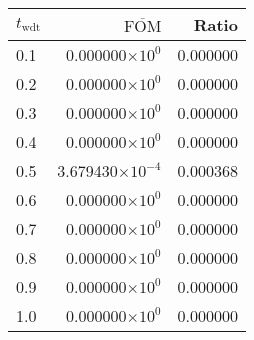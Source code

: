 \begin{tabular}{lrr}
\toprule
$t_{\mathrm{wdt}}$ & $\overline{\mathrm{FOM}}$ &    Ratio \\
\midrule
               0.1 &   0.000000$\times 10^{0}$ & 0.000000 \\
               0.2 &   0.000000$\times 10^{0}$ & 0.000000 \\
               0.3 &   0.000000$\times 10^{0}$ & 0.000000 \\
               0.4 &   0.000000$\times 10^{0}$ & 0.000000 \\
               0.5 &  3.679430$\times 10^{-4}$ & 0.000368 \\
               0.6 &   0.000000$\times 10^{0}$ & 0.000000 \\
               0.7 &   0.000000$\times 10^{0}$ & 0.000000 \\
               0.8 &   0.000000$\times 10^{0}$ & 0.000000 \\
               0.9 &   0.000000$\times 10^{0}$ & 0.000000 \\
               1.0 &   0.000000$\times 10^{0}$ & 0.000000 \\
\bottomrule
\end{tabular}
